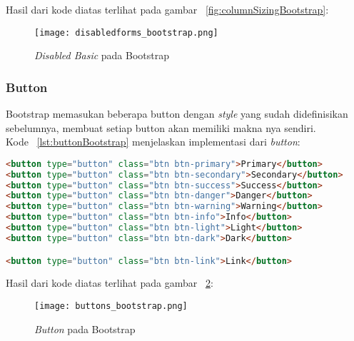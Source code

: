 \noindent Hasil dari kode diatas terlihat pada gambar ~\ref{fig:columnSizingBootstrap}:
\begin{figure} [H]
	\centering  
	\texttt{[image: disabledforms\_bootstrap.png]}  
	\caption{\textit{Disabled Basic} pada Bootstrap} 
	\label{fig:disabledFormBootstrap}
\end{figure}

\subsubsection{Button}
Bootstrap memasukan beberapa button dengan \textit{style} yang sudah didefinisikan sebelumnya, membuat setiap button akan memiliki makna nya sendiri.\\
\noindent Kode ~\ref{lst:buttonBootstrap} menjelaskan implementasi dari \textit{button}:

\begin{lstlisting}[style=customhtml, language=HTML,  basicstyle=\ttfamily, frame=single, columns=fullflexible, keepspaces=true, breaklines=true, showstringspaces=false, label={lst:buttonBootstrap}, caption=Button pada bootstrap 4.] 
<button type="button" class="btn btn-primary">Primary</button>
<button type="button" class="btn btn-secondary">Secondary</button>
<button type="button" class="btn btn-success">Success</button>
<button type="button" class="btn btn-danger">Danger</button>
<button type="button" class="btn btn-warning">Warning</button>
<button type="button" class="btn btn-info">Info</button>
<button type="button" class="btn btn-light">Light</button>
<button type="button" class="btn btn-dark">Dark</button>

<button type="button" class="btn btn-link">Link</button>
\end{lstlisting}

\noindent Hasil dari kode diatas terlihat pada gambar ~\ref{fig:buttonBootstrap}:
\begin{figure} [H]
	\centering  
	\texttt{[image: buttons\_bootstrap.png]}  
	\caption{\textit{Button} pada Bootstrap} 
	\label{fig:buttonBootstrap}
\end{figure}


